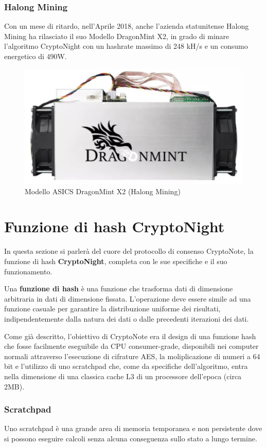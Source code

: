 \subsubsection{Halong Mining}
Con un mese di ritardo, nell'Aprile 2018, anche l'azienda statunitense Halong Mining ha rilasciato il suo Modello DragonMint X2, in grado di minare l'algoritmo CryptoNight con un hashrate massimo di 248 kH/s e un consumo energetico di 490W.

\begin{figure}[h!]
    \centering
    \includegraphics[width=0.2\linewidth]{images/DragonMint X2.png}
    \caption{Modello ASICS DragonMint X2 (Halong Mining)}
\end{figure}



\section{Funzione di hash CryptoNight}\label{funzione-di-hash-cryptonight}
In questa sezione si parlerà del cuore del protocollo di consenso
CryptoNote, la funzione di hash \textbf{CryptoNight}, completa con le
sue specifiche e il suo funzionamento. 

Una \textbf{funzione di hash} è una funzione che trasforma dati di
dimensione arbitraria in dati di dimensione fissata. L'operazione deve
essere simile ad una funzione casuale per garantire la distribuzione
uniforme dei risultati, indipendentemente dalla natura dei dati o
dalle precedenti iterazioni dei dati.

Come già descritto, l'obiettivo di CryptoNote era il design di una
funzione hash che fosse facilmente eseguibile da CPU consumer-grade,
disponibili nei computer normali attraverso l'esecuzione di cifrature
AES, la moliplicazione di numeri a 64 bit e l'utilizzo di uno scratchpad
che, come da specifiche dell'algoritmo, entra nella dimensione di una
classica cache L3 di un processore dell'epoca (circa 2MB). 


\subsubsection{Scratchpad}
Uno scratchpad è una grande area di memoria temporanea e non
persistente dove si possono eseguire calcoli senza alcuna conseguenza
sullo stato a lungo termine.

